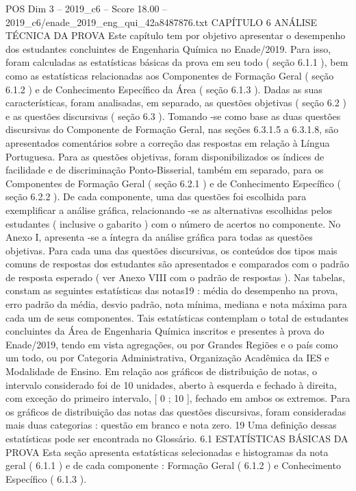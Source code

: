 \begin{textsample}{POS Dim 3 – 2019\_c6 – Score 18.00 – 2019\_c6/enade\_2019\_eng\_qui\_42a8487876.txt}  \label{ex:f3_pos_001}
CAPÍTULO 6 ANÁLISE TÉCNICA DA PROVA Este capítulo tem por objetivo apresentar o desempenho dos estudantes concluintes de Engenharia Química no Enade/2019.
Para isso, foram calculadas as estatísticas básicas da prova em seu todo ( seção 6.1.1 ), bem como as estatísticas relacionadas aos Componentes de Formação Geral ( seção 6.1.2 ) e de Conhecimento Específico da Área ( seção 6.1.3 ).
Dadas as suas características, foram analisadas, em separado, as questões objetivas ( seção 6.2 ) e as questões discursivas ( seção 6.3 ).
Tomando -se como base as duas questões discursivas do Componente de Formação Geral, nas seções 6.3.1.5 a 6.3.1.8, são apresentados comentários sobre a correção das respostas em relação à Língua Portuguesa.
Para as questões objetivas, foram disponibilizados os índices de facilidade e de discriminação Ponto-Bisserial, também em separado, para os Componentes de Formação Geral ( seção 6.2.1 ) e de Conhecimento Específico ( seção 6.2.2 ).
De cada componente, uma das questões foi escolhida para exemplificar a análise gráfica, relacionando -se as alternativas escolhidas pelos estudantes ( inclusive o gabarito ) com o número de acertos no componente.
No Anexo I, apresenta -se a íntegra da análise gráfica para todas as questões objetivas.
Para cada uma das questões discursivas, os conteúdos dos tipos mais comuns de respostas dos estudantes são apresentados e comparados com o padrão de resposta esperado ( ver Anexo VIII com o padrão de respostas ).
Nas tabelas, constam as seguintes estatísticas das notas19 : média do desempenho na prova, erro padrão da média, desvio padrão, nota mínima, mediana e nota máxima para cada um de seus componentes.
Tais estatísticas contemplam o total de estudantes concluintes da Área de Engenharia Química inscritos e presentes à prova do Enade/2019, tendo em vista agregações, ou por Grandes Regiões e o país como um todo, ou por Categoria Administrativa, Organização Acadêmica da IES e Modalidade de Ensino.
Em relação aos gráficos de distribuição de notas, o intervalo considerado foi de 10 unidades, aberto à esquerda e fechado à direita, com exceção do primeiro intervalo, [ 0 ; 10 ], fechado em ambos os extremos.
Para os gráficos de distribuição das notas das questões discursivas, foram consideradas mais duas categorias : questão em branco e nota zero. 19 Uma definição dessas estatísticas pode ser encontrada no Glossário. 6.1 ESTATÍSTICAS BÁSICAS DA PROVA Esta seção apresenta estatísticas selecionadas e histogramas da nota geral ( 6.1.1 ) e de cada componente : Formação Geral ( 6.1.2 ) e Conhecimento Específico ( 6.1.3 ).

\end{textsample}
